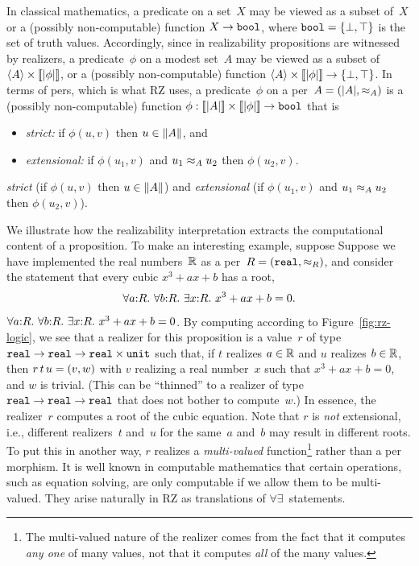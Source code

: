 In classical mathematics, a predicate on a set~$X$ may be viewed as a
subset of~$X$ or a (possibly non-computable) function $X \to \mathtt{bool}$,
where $\mathtt{bool} = \{\bot, \top\}$ is the set of truth values.
Accordingly, since in realizability propositions are witnessed by
realizers,
%
\iflong
a predicate~$\phi$ on a modest set~$A$ may be viewed as a
subset of $\langle A \rangle \times [\![|\phi|]\!]$, or a (possibly
non-computable) function $\langle A \rangle \times [\![|\phi|]\!] \to
\{\bot, \top\}$. In terms of pers, which is what RZ uses,
\fi
%
a predicate~$\phi$ on a per~$A = (|A|, {\approx_A})$ is a
(possibly non-computable) function $\phi : [\![|A|]\!] \times
[\![|\phi|]\!] \to \mathtt{bool}$ that is
%
\iflong
\begin{itemize}
\item \emph{strict:} if $\phi(u,v)$ then $u \in \|A\|$, and
\item \emph{extensional:} if $\phi(u_1,v)$ and $u_1 \approx_A u_2$ then
  $\phi(u_2,v)$.
\end{itemize}
\else %
\emph{strict} (if $\phi(u,v)$ then $u \in \|A\|$) 
and \emph{extensional} (if $\phi(u_1,v)$ and $u_1 \approx_A u_2$ then
  $\phi(u_2,v)$).
\fi

\iflong
We illustrate how the realizability interpretation extracts the
computational content of a proposition. To make an interesting
example, suppose
\else %
Suppose
\fi %
we have implemented the real
numbers~$\mathbb{R}$ as a per~$R = (\mathtt{real}, {\approx_R})$, and
consider  
\iflong
the statement
that every cubic $x^3 + a x + b$ has a root,
%
\begin{equation}
  \label{eq:square-root}%
  \iforall{a}{R}{\iforall{b}{R}{\iexists{x}{R}{\iequal{x^3 + a x + b}{0}}}}.
\end{equation}
\else %
$\forall a{:}R.\ \forall b{:}R.\ \exists x{:}R.\ x^3 + a x + b = 0$.
\fi %
%
By computing according to Figure~\ref{fig:rz-logic}, we see that
a realizer for this proposition is a value~$r$ of type
$\mathtt{real} \to \mathtt{real} \to \mathtt{real} \times \mathtt{unit}$
such that, if $t$ realizes $a \in \mathbb{R}$ and $u$ realizes $b \in
\mathbb{R}$, then $r\,t\,u = (v, w)$ with $v$ realizing a real
number~$x$ such that $x^3 + a x + b = 0$, and $w$ is trivial. (This
can be ``thinned'' to a realizer of type
$\mathtt{real} \to \mathtt{real} \to \mathtt{real}$ that
does not bother to compute~$w$.) In essence, the realizer~$r$
computes a root of the cubic equation. Note
that $r$ is \emph{not} extensional, i.e., different realizers~$t$
and~$u$ for the same~$a$ and~$b$ may result in different roots. 
To put this in another way, $r$ realizes a \emph{multi-valued}
function\footnote{The multi-valued nature of the realizer comes from
  the fact that it computes \emph{any one} of many values, not that it
  computes \emph{all} of the many values.} rather than a per
morphism. It is well known in computable mathematics that certain
operations, such as equation solving, are only computable if we allow
them to be multi-valued. They arise naturally in RZ as translations of
$\forall\exists$~statements.

